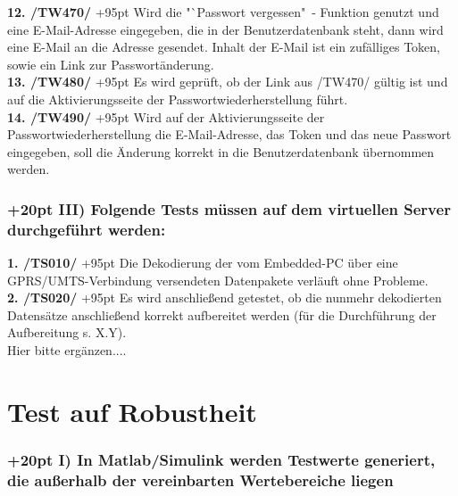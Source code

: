 \documentclass[fontsize = 12pt, paper = a4]{scrreprt}
\begin{document}
\textbf{12. /TW470/}
\hangindent+95pt 
\hspace*{2mm}
Wird die "`Passwort vergessen"\ - Funktion genutzt und eine E-Mail-Adresse eingegeben, die in der Benutzerdatenbank steht, dann wird eine E-Mail an die Adresse gesendet. Inhalt der E-Mail ist ein zufälliges Token, sowie ein Link zur Passwortänderung. \\

\textbf{13. /TW480/}
\hangindent+95pt 
\hspace*{2.5mm}
Es wird geprüft, ob der Link aus /TW470/ gültig ist und auf die Aktivierungsseite der Passwortwiederherstellung führt. \\

\textbf{14. /TW490/}
\hangindent+95pt 
\hspace*{2mm}
Wird auf der Aktivierungsseite der Passwortwiederherstellung die E-Mail-Adresse, das Token und das neue Passwort eingegeben, soll die Änderung korrekt in die Benutzerdatenbank übernommen werden.

\subsubsection*{
\hangindent+20pt 
III) Folgende Tests müssen auf dem virtuellen Server durchgeführt werden:}

\vspace*{3mm}

\textbf{1. /TS010/}
\hangindent+95pt 
\hspace*{8mm}
Die Dekodierung der vom Embedded-PC über eine GPRS/UMTS-Verbindung versendeten Datenpakete verläuft ohne Probleme. \\

\textbf{2. /TS020/}
\hangindent+95pt 
\hspace*{8mm}
Es wird anschließend getestet, ob die nunmehr dekodierten Datensätze anschließend korrekt aufbereitet werden (für die Durchführung der Aufbereitung s. X.Y). \\

Hier bitte ergänzen....


\newpage


\section{Test auf Robustheit}
\subsubsection*{
\hangindent+20pt 
I) In Matlab/Simulink werden Testwerte generiert, die außerhalb der vereinbarten Wertebereiche liegen \\} 
\end{document}
